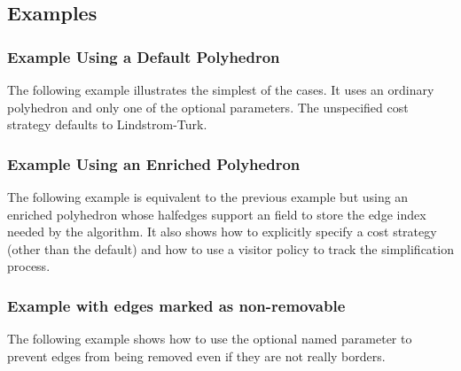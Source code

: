 \subsection{Examples}

\subsubsection{Example Using a Default Polyhedron}

The following example illustrates the simplest of the cases. It uses
an ordinary polyhedron and only one of the optional parameters.
The unspecified cost strategy defaults to Lindstrom-Turk.

\subsubsection{Example Using an Enriched Polyhedron}

The following example is equivalent to the previous example but using an
enriched polyhedron whose halfedges support an  field to
store the edge index needed by the algorithm. It also shows how to
explicitly specify a cost strategy (other than the default)
and how to use a visitor policy to track the simplification process.


\subsubsection{Example with edges marked as non-removable}

The following example shows how to use the optional named parameter  to prevent
edges from being removed even if they are not really borders.




